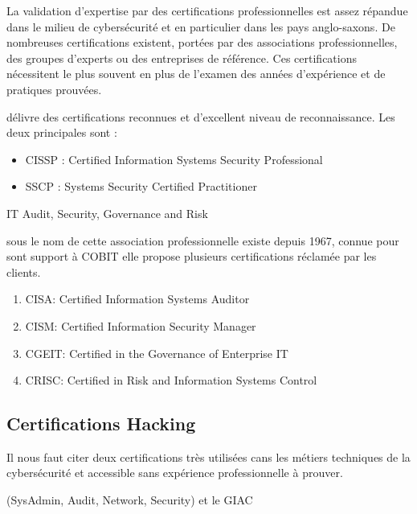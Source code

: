 La validation d'expertise par des certifications professionnelles est assez répandue dans le milieu de cybersécurité et en particulier dans les pays anglo-saxons. De nombreuses certifications existent, portées par des associations professionnelles, des groupes d'experts ou des entreprises de référence. Ces certifications nécessitent le plus souvent en plus de l'examen des années d'expérience et de pratiques prouvées.



   délivre des certifications reconnues et d'excellent niveau de reconnaissance.
Les deux principales sont :
\begin{itemize}
  \item CISSP : Certified Information Systems Security Professional
  \item SSCP : Systems Security Certified Practitioner
\end{itemize}


 IT Audit, Security, Governance and Risk 

sous le nom de  cette association professionnelle existe depuis 1967, connue pour sont support à COBIT elle propose plusieurs certifications réclamée par les clients. 


\begin{enumerate}
  \item CISA: Certified Information Systems Auditor
  \item CISM: Certified Information Security Manager
 \item CGEIT: Certified in the Governance of Enterprise IT
  \item CRISC: Certified in Risk and Information Systems Control
\end{enumerate}

\subsection{Certifications Hacking} 

Il nous faut citer deux certifications très utilisées cans les métiers techniques de la cybersécurité et accessible sans expérience professionnelle à prouver.

 (SysAdmin, Audit, Network, Security) et le GIAC 


